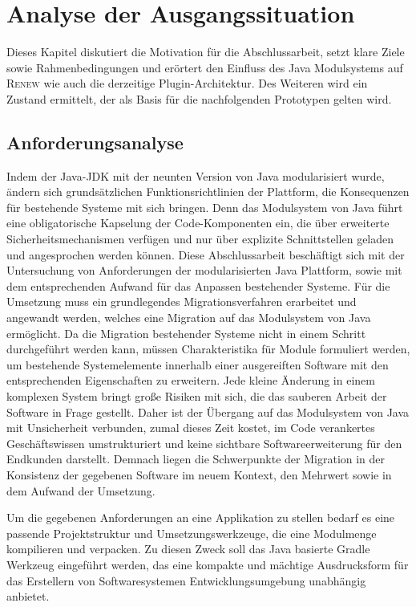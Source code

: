 \chapter{Analyse der Ausgangssituation}\label{cha:ausgangssituation}
	Dieses Kapitel diskutiert die Motivation für die Abschlussarbeit, setzt klare Ziele sowie Rahmenbedingungen und erörtert den Einfluss des Java Modulsystems auf \textsc{Renew} wie auch die derzeitige Plugin-Architektur. Des Weiteren wird ein Zustand ermittelt, der als Basis für die nachfolgenden Prototypen gelten wird.

\section{Anforderungsanalyse} 
	Indem der Java-JDK mit der neunten Version von Java modularisiert wurde, ändern sich grundsätzlichen Funktionsrichtlinien der Plattform, die Konsequenzen für bestehende Systeme mit sich bringen. Denn das Modulsystem von Java führt eine obligatorische Kapselung der Code-Komponenten ein, die über erweiterte Sicherheitsmechanismen verfügen und nur über explizite Schnittstellen geladen und angesprochen werden können.\newline 
	Diese Abschlussarbeit beschäftigt sich mit der Untersuchung von Anforderungen der modularisierten Java Plattform, sowie mit dem entsprechenden Aufwand für das Anpassen bestehender Systeme. \newline
	Für die Umsetzung muss ein grundlegendes Migrationsverfahren erarbeitet und angewandt werden, welches eine Migration auf das Modulsystem von Java ermöglicht. Da die Migration bestehender Systeme nicht in einem Schritt durchgeführt werden kann, müssen Charakteristika für Module formuliert werden, um bestehende Systemelemente innerhalb einer ausgereiften Software mit den entsprechenden Eigenschaften zu erweitern.\newline
	Jede kleine Änderung in einem komplexen System bringt große Risiken mit sich, die das sauberen Arbeit der Software in Frage gestellt. Daher ist der Übergang auf das Modulsystem von Java mit Unsicherheit verbunden, zumal dieses Zeit kostet, im Code verankertes Geschäftswissen umstrukturiert und keine sichtbare Softwareerweiterung für den Endkunden darstellt. Demnach liegen die Schwerpunkte der Migration in der Konsistenz der gegebenen Software im neuem Kontext, den Mehrwert sowie in dem Aufwand der Umsetzung. \bigbreak

	Um die gegebenen Anforderungen an eine Applikation zu stellen bedarf es eine passende Projektstruktur und Umsetzungswerkzeuge, die eine Modulmenge kompilieren und verpacken. Zu diesen Zweck soll das Java basierte Gradle Werkzeug eingeführt werden, das eine kompakte und mächtige Ausdrucksform für das Erstellern von Softwaresystemen Entwicklungsumgebung unabhängig anbietet. \bigbreak

